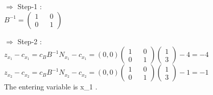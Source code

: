 \documentclass{beamer}
\begin{document}
\begin{frame}
$\Rightarrow$  Step-1 :  \\
\vspace{0cm}
\hspace{2cm}
 $ B^{-1} =\begin{pmatrix}
1 && 0   \\
0 && 1  
\end{pmatrix}$

$\Rightarrow$  Step-2 :  \\
\vspace{0.4cm}
$ z_{x_1} - c_{x_1} = c_{B}B^{-1}N_{x_1} - c_{x_1}  = (0,0) \begin{pmatrix}
1 && 0   \\
0 && 1  
\end{pmatrix} \begin{pmatrix}
1   \\
3  
\end{pmatrix} - 4 = -4 $   \\
\vspace{0.4cm}
$ z_{x_2} - c_{x_2} = c_{B}B^{-1}N_{x_2} - c_{x_2}  = (0,0) \begin{pmatrix}
1 && 0   \\
0 && 1  
\end{pmatrix} \begin{pmatrix}
1   \\
3 
\end{pmatrix} - 1 = -1 $  \\
\vspace{0.4cm}
The entering variable is x_1 .

\end{frame}
\end{document}
